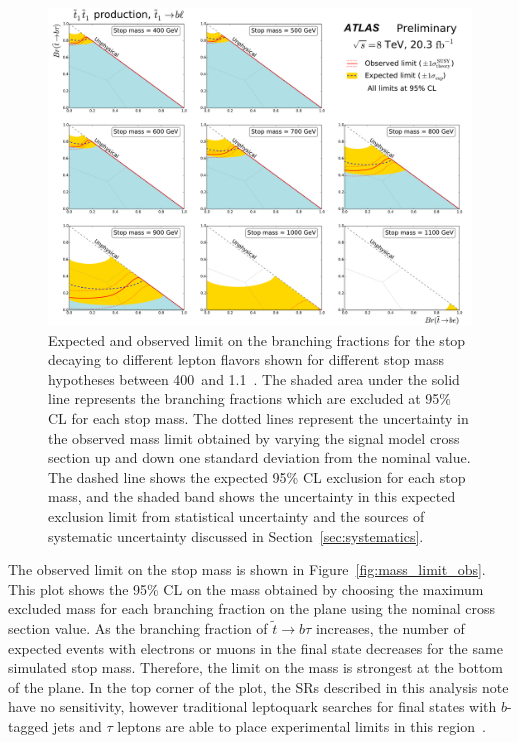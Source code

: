 \begin{figure}[p]
  \centering
  \includegraphics[width=\textwidth]{figs/blstop/limit_contours.pdf}
  \caption[
    Expected and observed limit on the branching fractions for the stop
    decaying to different lepton flavors shown for different stop mass
    hypotheses between 400~\GeV and 1.1~\TeV.
  ]{
    Expected and observed limit on the branching fractions for the stop
    decaying to different lepton flavors shown for different stop mass
    hypotheses between 400~\GeV and 1.1~\TeV.
    The shaded area under the solid line represents the branching fractions
    which are excluded at 95\% CL for each stop mass.
    The dotted lines represent the uncertainty in the observed mass limit
    obtained by varying the signal model cross section up and down one standard
    deviation from the nominal value.
    The dashed line shows the expected 95\% CL exclusion for each stop mass,
    and the shaded band shows the uncertainty in this expected exclusion limit
    from statistical uncertainty and the sources of systematic uncertainty
    discussed in Section~\ref{sec:systematics}.
  }
  \label{fig:limit_contours}
\end{figure}

The observed limit on the stop mass is shown in Figure~\ref{fig:mass_limit_obs}.
This plot shows the 95\% CL on the mass obtained by choosing
the maximum excluded mass for each branching fraction on the plane using the
nominal cross section value.  
As the branching fraction of $\tilde{t} \rightarrow b\tau$ increases, the number of
expected events with electrons or muons in the final state decreases for the
same simulated stop mass.
Therefore, the limit on the mass is strongest at the bottom of the plane.
In the top corner of the plot, the SRs described in this analysis note have no
sensitivity, however traditional leptoquark searches for final states with
$b$-tagged jets and $\tau$ leptons are able to place experimental limits in this
region~\cite{ATLAS:2013oea}.

